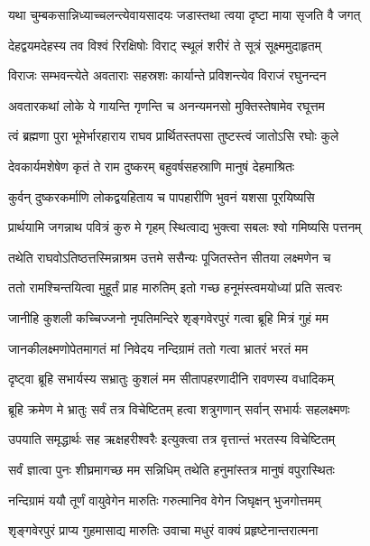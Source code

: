 \twolineshloka
{यथा चुम्बकसान्निध्याच्चलन्त्येवायसादयः}
{जडास्तथा त्वया दृष्टा माया सृजति वै जगत्} %

\twolineshloka
{देहद्वयमदेहस्य तव विश्वं रिरक्षिषोः}
{विराट् स्थूलं शरीरं ते सूत्रं सूक्ष्ममुदाहृतम्} %

\twolineshloka
{विराजः सम्भवन्त्येते अवताराः सहस्रशः}
{कार्यान्ते प्रविशन्त्येव विराजं रघुनन्दन} %

\twolineshloka
{अवतारकथां लोके ये गायन्ति गृणन्ति च}
{अनन्यमनसो मुक्तिस्तेषामेव रघूत्तम} %

\twolineshloka
{त्वं ब्रह्मणा पुरा भूमेर्भारहाराय राघव}
{प्रार्थितस्तपसा तुष्टस्त्वं जातोऽसि रघोः कुले} %

\twolineshloka
{देवकार्यमशेषेण कृतं ते राम दुष्करम्}
{बहुवर्षसहस्राणि मानुषं देहमाश्रितः} %

\twolineshloka
{कुर्वन् दुष्करकर्माणि लोकद्वयहिताय च}
{पापहारीणि भुवनं यशसा पूरयिष्यसि} %

\twolineshloka
{प्रार्थयामि जगन्नाथ पवित्रं कुरु मे गृहम्}
{स्थित्वाद्य भुक्त्वा सबलः श्वो गमिष्यसि पत्तनम्} %

\twolineshloka
{तथेति राघवोऽतिष्ठत्तस्मिन्नाश्रम उत्तमे}
{ससैन्यः पूजितस्तेन सीतया लक्ष्मणेन च} %

\twolineshloka
{ततो रामश्चिन्तयित्वा मुहूर्तं प्राह मारुतिम्}
{इतो गच्छ हनूमंस्त्वमयोध्यां प्रति सत्वरः} %

\twolineshloka
{जानीहि कुशली कच्चिज्जनो नृपतिमन्दिरे}
{शृङ्गवेरपुरं गत्वा ब्रूहि मित्रं गुहं मम} %

\twolineshloka
{जानकीलक्ष्मणोपेतमागतं मां निवेदय}
{नन्दिग्रामं ततो गत्वा भ्रातरं भरतं मम} %

\twolineshloka
{दृष्ट्वा ब्रूहि सभार्यस्य सभ्रातुः कुशलं मम}
{सीतापहरणादीनि रावणस्य वधादिकम्} %

\twolineshloka
{ब्रूहि क्रमेण मे भ्रातुः सर्वं तत्र विचेष्टितम्}
{हत्वा शत्रुगणान् सर्वान् सभार्यः सहलक्ष्मणः} %

\twolineshloka
{उपयाति समृद्धार्थः सह ऋक्षहरीश्वरैः}
{इत्युक्त्वा तत्र वृत्तान्तं भरतस्य विचेष्टितम्} %

\twolineshloka
{सर्वं ज्ञात्वा पुनः शीघ्रमागच्छ मम सन्निधिम्}
{तथेति हनुमांस्तत्र मानुषं वपुरास्थितः} %

\twolineshloka
{नन्दिग्रामं ययौ तूर्णं वायुवेगेन मारुतिः}
{गरुत्मानिव वेगेन जिघृक्षन् भुजगोत्तमम्} %

\twolineshloka
{शृङ्गवेरपुरं प्राप्य गुहमासाद्य मारुतिः}
{उवाचा मधुरं वाक्यं प्रहृष्टेनान्तरात्मना} %

